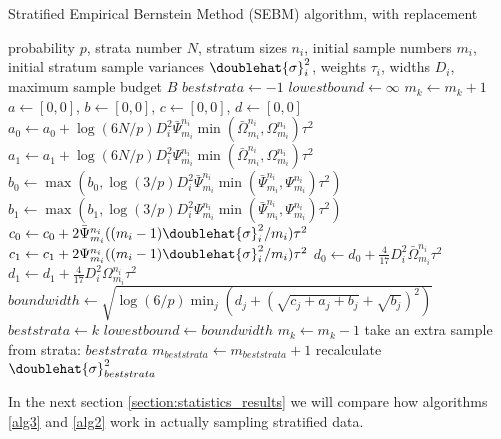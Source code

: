 \begin{algorithm}
\caption{Stratified Empirical Bernstein Method (SEBM) algorithm, with replacement}
\label{alg2}
\begin{algorithmic}[1]
    \REQUIRE probability $p$, strata number $N$, stratum sizes $n_i$, initial sample numbers $m_i$, initial stratum sample variances $\doublehat{\sigma}_i^2$, weights $\tau_i$, widths $D_i$, maximum sample budget $B$
        \STATE $beststrata \leftarrow -1$
        \STATE $lowestbound \leftarrow \infty$
    	    \STATE $m_k \leftarrow m_k + 1$
        	\STATE $a \leftarrow [0,0]$, $b \leftarrow [0,0]$, $c \leftarrow [0,0]$, $d \leftarrow [0,0]$
        		\STATE $a_0 \leftarrow a_0 + \log(6N/p)D_i^2\bar{\Psi}_{m_i}^{n_i}\min(\bar{\Omega}_{m_i}^{n_i},\Omega_{m_i}^{n_i})\tau^2$
        		\STATE $a_1 \leftarrow a_1 + \log(6N/p)D_i^2\Psi_{m_i}^{n_i}\min(\bar{\Omega}_{m_i}^{n_i},\Omega_{m_i}^{n_i})\tau^2$
        		\STATE $b_0 \leftarrow \max(b_0,\log(3/p)D_i^2\bar{\Psi}_{m_i}^{n_i}\min(\bar{\Psi}_{m_i}^{n_i},\Psi_{m_i}^{n_i})\tau^2)$
        		\STATE $b_1 \leftarrow \max(b_1,\log(3/p)D_i^2\Psi_{m_i}^{n_i}\min(\bar{\Psi}_{m_i}^{n_i},\Psi_{m_i}^{n_i})\tau^2)$
        		\STATE $c_0 \leftarrow c_0 + 2\bar{\Psi}_{m_i}^{n_i}((m_i-1)\doublehat{\sigma}_i^2/m_i)\tau^2$
        		\STATE $c_1 \leftarrow c_1 + 2\Psi_{m_i}^{n_i}((m_i-1)\doublehat{\sigma}_i^2/m_i)\tau^2$
        		\STATE $d_0 \leftarrow d_0 + \frac{4}{17}D_i^2\bar{\Omega}_{m_i}^{n_i}\tau^2$
        		\STATE $d_1 \leftarrow d_1 + \frac{4}{17}D_i^2\Omega_{m_i}^{n_i}\tau^2$
        	\ENDFOR
        	\STATE $boundwidth \leftarrow \sqrt{\log(6/p)\min_j(d_j + (\sqrt{c_j + a_j + b_j} + \sqrt{b_j})^2)}$
    	        \STATE $beststrata \leftarrow k$
    	        \STATE $lowestbound \leftarrow boundwidth$
    	    \ENDIF
    	    \STATE $m_k \leftarrow m_k - 1$
    	\ENDFOR
    	\STATE take an extra sample from strata: $beststrata$
	    \STATE $m_{beststrata} \leftarrow m_{beststrata} + 1$
    	\STATE recalculate $\doublehat{\sigma}_{beststrata}^2$
    \ENDWHILE
\end{algorithmic}
\end{algorithm}



In the next section \ref{section:statistics_results} we will compare how algorithms \ref{alg3} and \ref{alg2} work in actually sampling stratified data.






